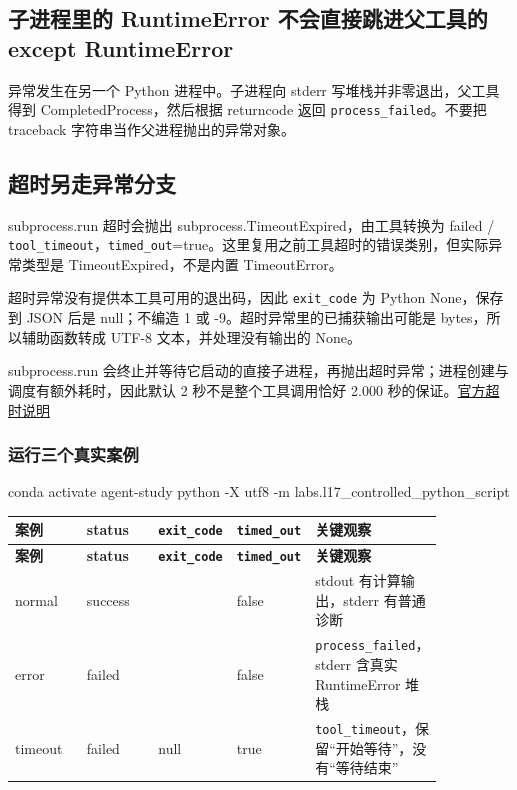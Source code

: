 \documentclass[UTF8,zihao=-4,fontset=fandol]{ctexart}
\begin{document}
\subsection{子进程里的 RuntimeError 不会直接跳进父工具的 except RuntimeError}

异常发生在另一个 Python 进程中。子进程向 stderr 写堆栈并非零退出，父工具得到 CompletedProcess，然后根据 returncode 返回 \nolinkurl{process_failed}。不要把 traceback 字符串当作父进程抛出的异常对象。

\subsection{超时另走异常分支}

subprocess.run 超时会抛出 subprocess.TimeoutExpired，由工具转换为 failed / \nolinkurl{tool_timeout}，\nolinkurl{timed_out}=true。这里复用之前工具超时的错误类别，但实际异常类型是 TimeoutExpired，不是内置 TimeoutError。

超时异常没有提供本工具可用的退出码，因此 \nolinkurl{exit_code} 为 Python None，保存到 JSON 后是 null；不编造 1 或 -9。超时异常里的已捕获输出可能是 bytes，所以辅助函数转成 UTF-8 文本，并处理没有输出的 None。

subprocess.run 会终止并等待它启动的直接子进程，再抛出超时异常；进程创建与调度有额外耗时，因此默认 2 秒不是整个工具调用恰好 2.000 秒的保证。\href{https://docs.python.org/3.11/library/subprocess.html\#subprocess.run}{官方超时说明}

\subsubsection{运行三个真实案例}

\begin{Code}
conda activate agent-study
python -X utf8 -m labs.l17_controlled_python_script
\end{Code}

{\small\setlength{\tabcolsep}{4pt}
\renewcommand{\arraystretch}{1.25}
\begin{longtable}{>{\raggedright\arraybackslash}p{0.16999999999999998\linewidth}>{\raggedright\arraybackslash}p{0.16999999999999998\linewidth}>{\raggedright\arraybackslash}p{0.16999999999999998\linewidth}>{\raggedright\arraybackslash}p{0.16999999999999998\linewidth}>{\raggedright\arraybackslash}p{0.16999999999999998\linewidth}}
\toprule
\textbf{案例} & \textbf{status} & \textbf{\nolinkurl{exit_code}} & \textbf{\nolinkurl{timed_out}} & \textbf{关键观察} \\
\midrule\endfirsthead
\toprule
\textbf{案例} & \textbf{status} & \textbf{\nolinkurl{exit_code}} & \textbf{\nolinkurl{timed_out}} & \textbf{关键观察} \\
\midrule\endhead
\bottomrule\endfoot
normal & success & 0 & false & stdout 有计算输出，stderr 有普通诊断 \\
error & failed & 1 & false & \nolinkurl{process_failed}，stderr 含真实 RuntimeError 堆栈 \\
timeout & failed & null & true & \nolinkurl{tool_timeout}，保留“开始等待”，没有“等待结束” \\
\end{longtable}}
\end{document}
